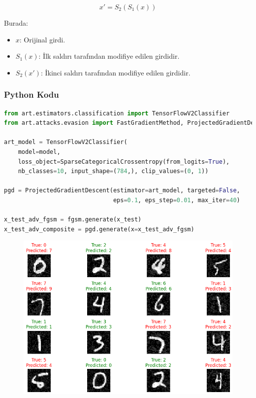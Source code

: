 \[ x' = S_2(S_1(x)) \]

Burada:

\begin{itemize}
    \item $x$: Orijinal girdi.
    \item $S_1(x)$: İlk saldırı tarafından modifiye edilen girdidir.
    \item $S_2(x')$: İkinci saldırı tarafından modifiye edilen girdidir.
\end{itemize}

\subsubsection{Python Kodu}

\begin{lstlisting}[language=Python]
from art.estimators.classification import TensorFlowV2Classifier
from art.attacks.evasion import FastGradientMethod, ProjectedGradientDescent

art_model = TensorFlowV2Classifier(
    model=model, 
    loss_object=SparseCategoricalCrossentropy(from_logits=True), 
    nb_classes=10, input_shape=(784,), clip_values=(0, 1))

pgd = ProjectedGradientDescent(estimator=art_model, targeted=False, 
                               eps=0.1, eps_step=0.01, max_iter=40)

x_test_adv_fgsm = fgsm.generate(x_test)
x_test_adv_composite = pgd.generate(x=x_test_adv_fgsm)
\end{lstlisting}

\newpage

\begin{figure}[h]
    \centering
    \includegraphics[width=1\textwidth]{images/composite_adversarial_attack_results.png}
    \caption{}
\end{figure}


